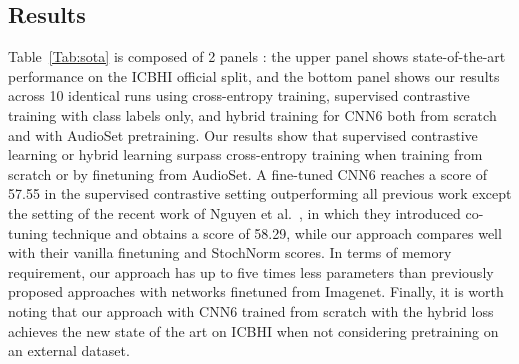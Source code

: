 \documentclass{article}
\begin{document}
\begin{sloppy}
\subsection{Results}
\label{ssec:results}
Table~\ref{Tab:sota} is composed of 2 panels : the upper panel shows state-of-the-art performance on the ICBHI official split, and the bottom panel shows our results across 10 identical runs using cross-entropy training, supervised contrastive training with class labels only, and hybrid training for CNN6 both from scratch and with AudioSet pretraining. Our results show that supervised contrastive learning or hybrid learning surpass cross-entropy training when training from scratch or by finetuning from AudioSet. A fine-tuned CNN6 reaches a score of 57.55 in the supervised contrastive setting outperforming all previous work except the setting of the recent work of Nguyen et al.~\cite{9729496}, in which they introduced co-tuning technique and obtains a score of 58.29, while our approach compares well with their vanilla finetuning and StochNorm scores. In terms of memory requirement, our approach has up to five times less parameters than previously proposed approaches with networks finetuned from Imagenet. Finally, it is worth noting that our approach with CNN6 trained from scratch with the hybrid loss achieves the new state of the art on ICBHI when not considering pretraining on an external dataset.

\begin{table}[]
\caption{Results on IBCHI using metadata}
\label{Tab:tab2}
\end{table}


\end{sloppy}
\end{document}
